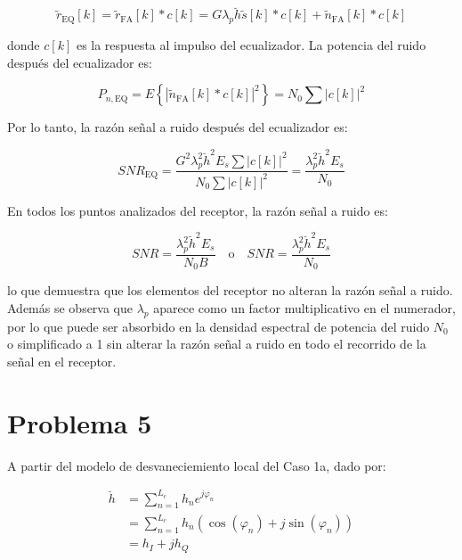 \documentclass[11pt]{article}
\begin{document}
\begin{equation*}
    \tilde{r}_{\text{EQ}}[k] = \tilde{r}_{\text{FA}}[k] * c[k] = G \lambda_p \breve{h} \tilde{s}[k] * c[k] + \tilde{n}_{\text{FA}}[k] * c[k]
\end{equation*}

donde \(c[k]\) es la respuesta al impulso del ecualizador. La potencia del ruido después del ecualizador es:

\begin{equation*}
    P_{n, \text{EQ}} = E\left\{|\tilde{n}_{\text{FA}}[k] * c[k]|^2\right\} = N_0 \sum |c[k]|^2
\end{equation*}

Por lo tanto, la razón señal a ruido después del ecualizador es:

\begin{equation*}
    SNR_{\text{EQ}} = \frac{G^2 \lambda_p^2 \breve{h}^2 E_s \sum |c[k]|^2}{N_0 \sum |c[k]|^2} = \frac{\lambda_p^2 \breve{h}^2 E_s}{N_0}
\end{equation*}


En todos los puntos analizados del receptor, la razón señal a ruido es:

\begin{equation*}
    SNR = \frac{\lambda_p^2 \breve{h}^2 E_s}{N_0 B} \quad \text{o} \quad SNR = \frac{\lambda_p^2 \breve{h}^2 E_s}{N_0}
\end{equation*}

lo que demuestra que los elementos del receptor no alteran la razón señal a ruido. Además se observa que \(\lambda_p\) aparece como un factor multiplicativo en el numerador, por lo que puede ser absorbido en la densidad espectral de potencia del ruido \(N_0\) o simplificado a 1 sin alterar la razón señal a ruido en todo el recorrido de la señal en el receptor.

\section*{Problema 5}

A partir del modelo de desvaneciemiento local del Caso 1a, dado por:

\begin{align}
    \breve{h} &= \sum_{n=1}^{L_c} h_n e^{j \varphi_n} \\
    & = \sum_{n=1}^{L_c} h_n \left( \cos(\varphi_n) + j \sin(\varphi_n) \right) \\
    & = h_I + j h_Q
\end{align}
\end{document}
